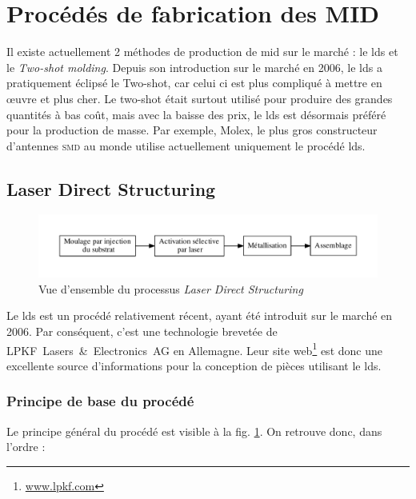 \section{Procédés de fabrication des MID}
Il existe actuellement 2 méthodes de production de \gls{mid} sur le marché : le \gls{lds} et le \emph{Two-shot molding}.
Depuis son introduction sur le marché en 2006, le \gls{lds} a pratiquement éclipsé le Two-shot, car celui ci est plus compliqué à mettre en œuvre et plus cher.
Le two-shot était surtout utilisé pour produire des grandes quantités à bas coût, mais avec la baisse des prix, le \gls{lds} est désormais préféré pour la production de masse.
Par exemple, Molex, le plus gros constructeur d'antennes \textsc{smd} au monde utilise actuellement uniquement le procédé \gls{lds}.

\subsection{Laser Direct Structuring}
\begin{figure}[h]
    \begin{center}
        \includegraphics[width=\textwidth]{images/lds_process}
        \caption{Vue d'ensemble du processus \emph{Laser Direct Structuring}}\label{fig:lds-process}
    \end{center}
\end{figure}
Le \gls{lds} est un procédé relativement récent, ayant été introduit sur le marché en 2006.
Par conséquent, c'est une technologie brevetée de LPKF~Lasers~\&~Electronics~AG en Allemagne.
Leur site web\footnote{\url{www.lpkf.com}} est donc une excellente source d'informations pour la conception de pièces utilisant le \gls{lds}.

\subsubsection{Principe de base du procédé}
Le principe général du procédé est visible à la fig.
\ref{fig:lds-process}.
On retrouve donc, dans l'ordre :

